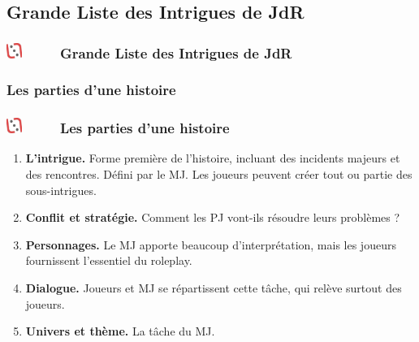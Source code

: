 \documentclass[slidetop,11pt]{beamer}
\def\moreInFrameTitleLeftt{\includegraphics[height=0.5cm]{img/ligueludique-0.png}~~~~~}
\begin{document}

\def\sectionPartIIb{Grande Liste des Intrigues de JdR}
\subsection{\sectionPartIIb}
\begin{frame}
	\frametitle{\moreInFrameTitleLeftt \sectionPartIIb }
	\tableofcontents[sections=2,currentsection,subsectionstyle=show/shaded/hide]
\end{frame} 


\def\sectionPartIIbI{Les parties d'une histoire}
\subsubsection{\sectionPartIIbI}
\begin{frame}
	\frametitle{\moreInFrameTitleLeftt \sectionPartIIbI}
	\begin{enumerate}
		\item \textbf{L'intrigue. }Forme premi{\`e}re de l'histoire, incluant des incidents majeurs et des rencontres. D{\'e}fini par le MJ. Les joueurs peuvent cr{\'e}er tout ou partie des sous-intrigues.
		\item \textbf{Conflit et strat{\'e}gie. }Comment les PJ vont-ils r{\'e}soudre leurs probl{\`e}mes ?
		\item \textbf{Personnages. }Le MJ apporte beaucoup d'interpr{\'e}tation, mais les joueurs fournissent l'essentiel du roleplay.
		\item \textbf{Dialogue. }Joueurs et MJ se r{\'e}partissent cette t{\^a}che, qui rel{\`e}ve surtout des joueurs.
		\item \textbf{Univers et th{\`e}me. }La t{\^a}che du MJ.
	\end{enumerate}
\end{frame} 


\def\sectionPartIIbII{36 Intrigues en JdR}
\end{document}
